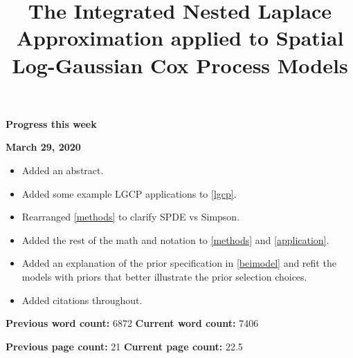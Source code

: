 \documentclass[]{interact}
\begin{document}
{\Large\bf Progress this week}

{\large\bf March 29, 2020}

\begin{itemize}

\item Added an abstract.

\item Added some example LGCP applications to \ref{lgcp}.

\item Rearranged \ref{methods} to clarify SPDE vs Simpson.

\item Added the rest of the math and notation to \ref{methods} and
\ref{application}.

\item Added an explanation of the prior specification in \ref{beimodel} and
refit the models with priors that better illustrate the prior selection
choices.

\item Added citations throughout.

\end{itemize}

\vfill

\textbf{Previous word count:} 6872 \hfill \textbf{Current word count:} 7406

\textbf{Previous page count:} 21 \hfill \textbf{Current page count:} 22.5

\pagebreak


\title{The Integrated Nested Laplace Approximation applied to Spatial Log-Gaussian Cox Process Models}

\author{
}

\maketitle
\end{document}
